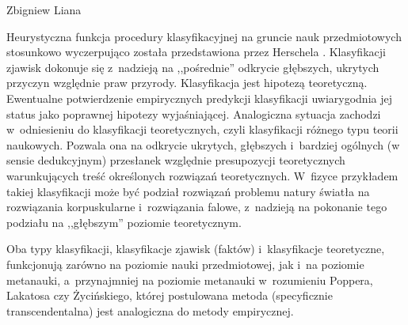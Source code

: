 \begin{artplenv}{Zbigniew Liana}
\begin{uwaga}
Heurystyczna funkcja procedury klasyfikacyjnej na gruncie nauk przedmiotowych stosunkowo wyczerpująco
została przedstawiona przez Herschela \parencite*[s.~131–139]{herschel_wstep_1955}.
Klasyfikacji zjawisk
dokonuje się z~nadzieją na ,,pośrednie'' odkrycie głębszych, ukrytych przyczyn względnie praw przyrody. Klasyfikacja jest
hipotezą teoretyczną. Ewentualne potwierdzenie empirycznych predykcji klasyfikacji uwiarygodnia jej status jako
poprawnej hipotezy wyjaśniającej. Analogiczna sytuacja zachodzi w~odniesieniu do klasyfikacji teoretycznych, czyli
klasyfikacji różnego typu teorii naukowych. Pozwala ona na odkrycie ukrytych, głębszych i~bardziej ogólnych (w sensie
dedukcyjnym) przesłanek względnie presupozycji teoretycznych warunkujących treść określonych rozwiązań
teoretycznych. W~fizyce przykładem takiej klasyfikacji może być podział rozwiązań problemu natury światła na rozwiązania
korpuskularne i~rozwiązania falowe, z~nadzieją na pokonanie tego podziału na ,,głębszym'' poziomie teoretycznym.

Oba typy klasyfikacji, klasyfikacje zjawisk (faktów) i~klasyfikacje teoretyczne, funkcjonują zarówno na poziomie nauki
przedmiotowej, jak i~na poziomie metanauki, a~przynajmniej na poziomie metanauki w~rozumieniu Poppera, Lakatosa czy
Życińskiego, której postulowana metoda (specyficznie transcendentalna) jest analogiczna do metody empirycznej.
\end{uwaga}


\end{artplenv}
